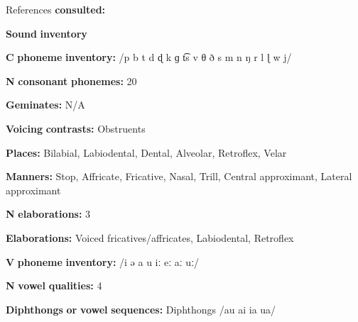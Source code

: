 \documentclass[output=paper]{langsci/langscibook}
\begin{document}
\begin{styleBody}
References \textbf{consulted:} \citet{Chen2006}
\end{styleBody}

\begin{styleBody}
\textbf{Sound} \textbf{inventory}
\end{styleBody}

\begin{styleBody}
\textbf{C} \textbf{phoneme} \textbf{inventory:} /p b t d ɖ k ɡ t͡s v θ ð s m n ŋ r l ɭ w j/
\end{styleBody}

\begin{styleBody}
\textbf{N} \textbf{consonant} \textbf{phonemes:} 20
\end{styleBody}

\begin{styleBody}
\textbf{Geminates:} N/A
\end{styleBody}

\begin{styleBody}
\textbf{Voicing} \textbf{contrasts:} Obstruents
\end{styleBody}

\begin{styleBody}
\textbf{Places:} Bilabial, Labiodental, Dental, Alveolar, Retroflex, Velar
\end{styleBody}

\begin{styleBody}
\textbf{Manners:} Stop, Affricate, Fricative, Nasal, Trill, Central approximant, Lateral approximant
\end{styleBody}

\begin{styleBody}
\textbf{N} \textbf{elaborations:} 3
\end{styleBody}

\begin{styleBody}
\textbf{Elaborations:} Voiced fricatives/affricates, Labiodental, Retroflex
\end{styleBody}

\begin{styleBody}
\textbf{V} \textbf{phoneme} \textbf{inventory:} /i ə a u iː eː aː uː/
\end{styleBody}

\begin{styleBody}
\textbf{N} \textbf{vowel} \textbf{qualities:} 4
\end{styleBody}

\begin{styleBody}
\textbf{Diphthongs} \textbf{or} \textbf{vowel} \textbf{sequences:} Diphthongs /au ai ia ua/
\end{styleBody}
\end{document}
